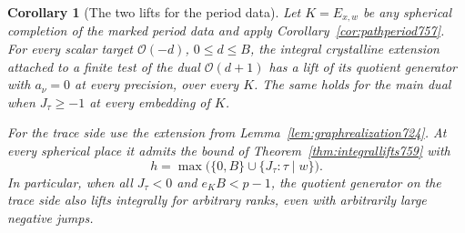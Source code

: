 \documentclass[a4paper,11pt]{article}
\newtheorem{corollary}[proposition]{Corollary}
\theoremstyle{definition}
\theoremstyle{remark}
\numberwithin{equation}{section}
\begin{document}
\begin{corollary}[The two lifts for the period data]
\leavevmode\label{cor:periodlifts759}
Let \(K=E_{x,w}\) be any spherical completion of the marked
period data and apply Corollary~\ref{cor:pathperiod757}.
For every scalar target \(\mathcal O(-d)\), \(0\le d\le B\),
the integral crystalline extension attached to a finite test
of the dual \(\mathcal O(d+1)\) has a lift of its quotient
generator with \(a_\nu=0\) at every precision, over every \(K\).
The same holds for the main dual when \(J_\tau\ge-1\) at every
embedding of \(K\).

For the trace side use the extension from
Lemma~\ref{lem:graphrealization724}. At every spherical place it
admits the bound of Theorem~\ref{thm:integrallifts759} with
\[
                 h=\max\big(\{0,B\}\cup\{J_\tau:\tau\mid w\}\big).
\]
In particular, when all \(J_\tau<0\) and \(e_K B<p-1\), the
quotient generator on the trace side also lifts integrally for
arbitrary ranks, even with arbitrarily large negative jumps.
\end{corollary}
\end{document}
